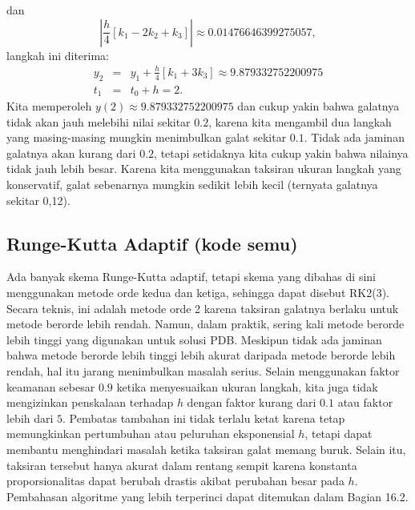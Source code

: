 dan 
\[
\left|\frac{h}{4}\left[k_{1}-2k_{2}+k_{3}\right]\right|\approx0.01476646399275057,
\]
langkah ini diterima:
\begin{eqnarray*}
y_{2} & = & y_{1}+\frac{h}{4}\left[k_{1}+3k_{3}\right]\approx9.879332752200975\\
t_{1} & = & t_{0}+h=2.
\end{eqnarray*}
Kita memperoleh $y(2)\approx9.879332752200975$ dan cukup yakin bahwa
galatnya tidak akan jauh melebihi nilai sekitar $0.2$, karena kita
mengambil dua langkah yang masing-masing mungkin menimbulkan galat
sekitar $0.1$. Tidak ada jaminan galatnya akan kurang dari $0.2$,
tetapi setidaknya kita cukup yakin bahwa nilainya tidak jauh lebih
besar. Karena kita menggunakan taksiran ukuran langkah yang konservatif,
galat sebenarnya mungkin sedikit lebih kecil (ternyata galatnya sekitar
0,12).

\subsection{Runge-Kutta Adaptif (kode semu)}

Ada banyak skema Runge-Kutta adaptif, tetapi skema yang dibahas di
sini menggunakan metode orde kedua dan ketiga, sehingga dapat disebut
RK2(3). Secara teknis, ini adalah metode orde
2 karena taksiran galatnya berlaku untuk metode berorde lebih rendah.
Namun, dalam praktik, sering kali metode berorde lebih tinggi yang
digunakan untuk solusi PDB. Meskipun tidak ada jaminan bahwa metode
berorde lebih tinggi lebih akurat daripada metode berorde lebih rendah,
hal itu jarang menimbulkan masalah serius. Selain menggunakan faktor
keamanan sebesar $0.9$ ketika menyesuaikan ukuran langkah, kita juga
tidak mengizinkan penskalaan terhadap $h$ dengan faktor kurang dari
$0.1$ atau faktor lebih dari $5$. Pembatas tambahan ini tidak terlalu
ketat karena tetap memungkinkan pertumbuhan atau peluruhan eksponensial
$h$, tetapi dapat membantu menghindari masalah ketika taksiran galat
memang buruk. Selain itu, taksiran tersebut hanya akurat dalam rentang
sempit karena konstanta proporsionalitas dapat berubah drastis akibat
perubahan besar pada $h$. Pembahasan algoritme yang lebih terperinci
dapat ditemukan dalam \cite{recipes} Bagian 16.2.

